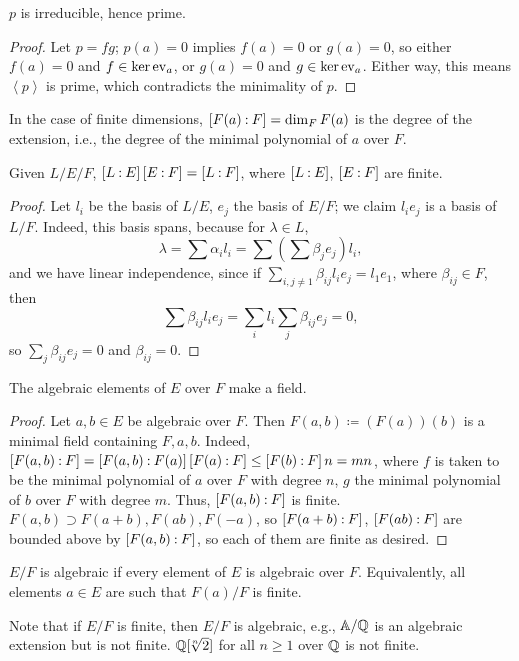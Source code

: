 \begin{claim}
    $p$ is irreducible, hence prime.
\end{claim}
\begin{proof}
    Let $p = f g$; $p(a) = 0$ implies $f(a) = 0$ or $g(a) = 0$, so either $f(a) = 0$ and $f \in \ker \operatorname{ev}_a$, or $g(a) = 0$ and $g \in \ker \operatorname{ev}_a$. Either way, this means $\left<p\right>$ is prime, which contradicts the minimality of $p$. 
\end{proof}
In the case of finite dimensions, $\coor{F(a):F} = \dim_F F(a)$ is the degree of the extension, i.e., the degree of the minimal polynomial of $a$ over $F$.
\begin{lemma}
    Given $L/E/F$, $\coor{L:E} \coor{E:F} = \coor{L:F}$, where $\coor{L:E}$, $\coor{E:F}$ are finite.
\end{lemma}
\begin{proof}
    Let $l_i$ be the basis of $L/E$, $e_j$ the basis of $E/F$; we claim $l_i e_j$ is a basis of $L/F$. Indeed, this basis spans, because for $\lambda \in L$,
    \[ \lambda = \sum \alpha_i l_i = \sum \left(\sum \beta_j e_j\right) l_i, \]
    and we have linear independence, since if $\sum_{i, j \neq 1} \beta_{ij} l_i e_j = l_1 e_1$, where $\beta_{ij} \in F$, then
    \[ \sum \beta_{ij} l_i e_j = \sum_i l_i \sum_j \beta_{ij} e_j = 0, \]
    so $\sum_j \beta_{ij} e_j = 0$ and $\beta_{ij} = 0$.
\end{proof}
\begin{theorem}
    The algebraic elements of $E$ over $F$ make a field.
\end{theorem}
\begin{proof}
    Let $a, b \in E$ be algebraic over $F$. Then $F(a, b) \coloneq (F(a))(b)$ is a minimal field containing $F, a, b$. Indeed, $\coor{F(a, b) : F} = \coor{F(a, b) : F(a)} \coor{F(a) : F} \leq \coor{F(b) : F} n = mn$, where $f$ is taken to be the minimal polynomial of $a$ over $F$ with degree $n$, $g$ the minimal polynomial of $b$ over $F$ with degree $m$. Thus, $\coor{F(a,b) : F}$ is finite. $F(a, b) \supset F(a + b), F(ab), F(-a)$, so $\coor{F(a+b):F}$, $\coor{F(ab):F}$ are bounded above by $\coor{F(a, b) : F}$, so each of them are finite as desired.
\end{proof}
\begin{definition}
    $E/F$ is algebraic if every element of $E$ is algebraic over $F$. Equivalently, all elements $a \in E$ are such that $F(a) / F$ is finite.
\end{definition}
Note that if $E/F$ is finite, then $E/F$ is algebraic, e.g., $\mathbb{A}/\mathbb Q$ is an algebraic extension but is not finite. $\mathbb Q[\!\sqrt[n]{2}]$ for all $n \geq 1$ over $\mathbb Q$ is not finite.
